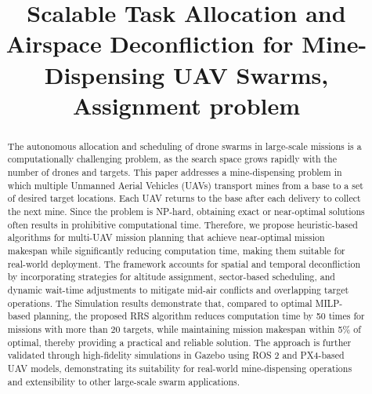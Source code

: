 \documentclass[subscriptcorrection,upint,nolists, varvw,barcolor=Goldenrod3,mathalfa=cal=euler,balance,hyphenate,french]{asmejour} %
\begin{document}


\title{Scalable Task Allocation and Airspace
Deconfliction for Mine-Dispensing UAV Swarms, Assignment problem}

   
\begin{abstract}
The autonomous allocation and scheduling of drone swarms in large-scale missions is a computationally challenging problem, as the search space grows rapidly with the number of drones and targets. 
This paper addresses a mine-dispensing problem in which multiple Unmanned Aerial Vehicles (UAVs) transport mines from a base to a set of desired target locations. Each UAV returns to the base after each delivery to collect the next mine.
Since the problem is NP-hard, obtaining exact or near-optimal solutions often results in prohibitive computational time. 
Therefore, we propose heuristic-based algorithms for multi-UAV mission planning that achieve near-optimal mission makespan while significantly reducing computation time, making them suitable for real-world deployment. 
The framework accounts for spatial and temporal deconfliction by incorporating strategies for altitude assignment, sector-based scheduling, and dynamic wait-time adjustments to mitigate mid-air conflicts and overlapping target operations. 
The Simulation results demonstrate that, compared to optimal MILP-based planning, the proposed RRS algorithm reduces computation time by 50 times for missions with more than 20 targets, while maintaining mission makespan within 5\% of optimal, thereby providing a practical and reliable solution.
The approach is further validated through high-fidelity simulations in Gazebo using ROS 2 and PX4-based UAV models, demonstrating its suitability for real-world mine-dispensing operations and extensibility to other large-scale swarm applications.

\end{abstract}
\end{document}

